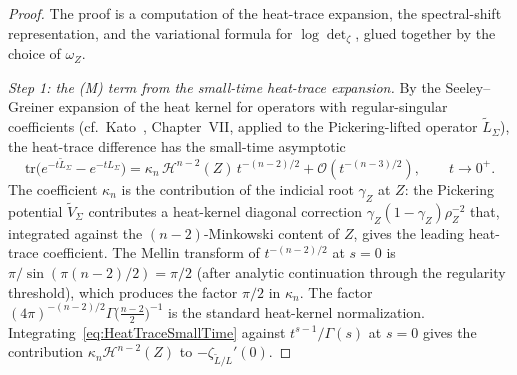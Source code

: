 \begin{proof}
The proof is a computation of the heat-trace expansion, the spectral-shift representation, and the variational formula for $\log\det\nolimits_\zeta$, glued together by the choice of $\omega_Z$.

\smallskip
\emph{Step 1: the (M) term from the small-time heat-trace expansion.}
By the Seeley--Greiner expansion of the heat kernel for operators with regular-singular coefficients (cf.\ Kato~\cite{kato1995}, Chapter~VII, applied to the Pickering-lifted operator $\tilde L_\Sigma$), the heat-trace difference has the small-time asymptotic
\begin{equation}\label{eq:HeatTraceSmallTime}
    \mathrm{tr}\bigl(e^{-t\tilde L_\Sigma}-e^{-tL_\Sigma}\bigr)
    =
    \kappa_n\,\mathcal H^{n-2}(Z)\,t^{-(n-2)/2}
    +\mathcal O(t^{-(n-3)/2}),
    \qquad t\to0^+.
\end{equation}
The coefficient $\kappa_n$ is the contribution of the indicial root $\gamma_Z$ at $Z$: the Pickering potential $\tilde V_\Sigma$ contributes a heat-kernel diagonal correction $\gamma_Z(1-\gamma_Z)\rho_Z^{-2}$ that, integrated against the $(n-2)$-Minkowski content of $Z$, gives the leading heat-trace coefficient. The Mellin transform of $t^{-(n-2)/2}$ at $s=0$ is $\pi/\sin(\pi(n-2)/2)=\pi/2$ (after analytic continuation through the regularity threshold), which produces the factor $\pi/2$ in $\kappa_n$. The factor $(4\pi)^{-(n-2)/2}\Gamma\bigl(\tfrac{n-2}{2}\bigr)^{-1}$ is the standard heat-kernel normalization. Integrating~\eqref{eq:HeatTraceSmallTime} against $t^{s-1}/\Gamma(s)$ at $s=0$ gives the contribution $\kappa_n\mathcal H^{n-2}(Z)$ to $-\zeta_{\tilde L/L}'(0)$.


\end{proof}
